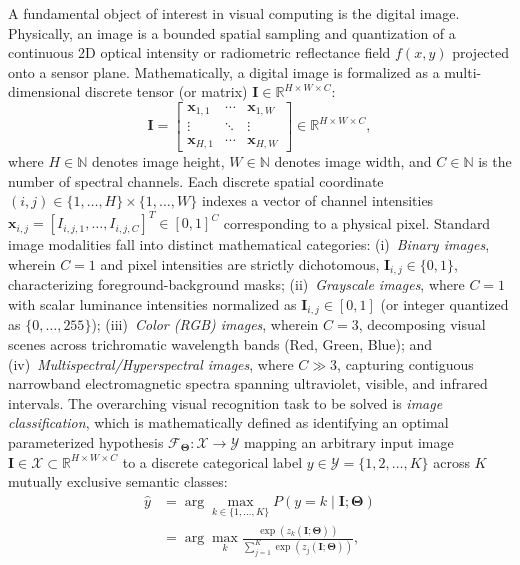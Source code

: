 \documentclass[journal]{IEEEtran}
\begin{document}
A fundamental object of interest in visual computing is the digital image. Physically, an image is a bounded spatial sampling and quantization of a continuous 2D optical intensity or radiometric reflectance field $f(x, y)$ projected onto a sensor plane. Mathematically, a digital image is formalized as a multi-dimensional discrete tensor (or matrix) $\mathbf{I} \in \mathbb{R}^{H \times W \times C}$:
\begin{equation}
\mathbf{I} = \begin{bmatrix}
\mathbf{x}_{1,1} & \cdots & \mathbf{x}_{1,W} \\
\vdots & \ddots & \vdots \\
\mathbf{x}_{H,1} & \cdots & \mathbf{x}_{H,W}
\end{bmatrix} \in \mathbb{R}^{H \times W \times C},
\label{eq:image_tensor_matrix}
\end{equation}
where $H \in \mathbb{N}$ denotes image height, $W \in \mathbb{N}$ denotes image width, and $C \in \mathbb{N}$ is the number of spectral channels. Each discrete spatial coordinate $(i, j) \in \{1, \dots, H\} \times \{1, \dots, W\}$ indexes a vector of channel intensities $\mathbf{x}_{i,j} = [I_{i,j,1}, \dots, I_{i,j,C}]^T \in [0, 1]^C$ corresponding to a physical pixel. Standard image modalities fall into distinct mathematical categories: (i)~\textit{Binary images}, wherein $C=1$ and pixel intensities are strictly dichotomous, $\mathbf{I}_{i,j} \in \{0, 1\}$, characterizing foreground-background masks; (ii)~\textit{Grayscale images}, where $C=1$ with scalar luminance intensities normalized as $\mathbf{I}_{i,j} \in [0, 1]$ (or integer quantized as $\{0, \dots, 255\}$); (iii)~\textit{Color (RGB) images}, wherein $C=3$, decomposing visual scenes across trichromatic wavelength bands (Red, Green, Blue); and (iv)~\textit{Multispectral/Hyperspectral images}, where $C \gg 3$, capturing contiguous narrowband electromagnetic spectra spanning ultraviolet, visible, and infrared intervals. The overarching visual recognition task to be solved is \textit{image classification}, which is mathematically defined as identifying an optimal parameterized hypothesis $\mathcal{F}_{\boldsymbol{\Theta}}: \mathcal{X} \to \mathcal{Y}$ mapping an arbitrary input image $\mathbf{I} \in \mathcal{X} \subset \mathbb{R}^{H \times W \times C}$ to a discrete categorical label $y \in \mathcal{Y} = \{1, 2, \dots, K\}$ across $K$ mutually exclusive semantic classes:
\begin{align}
\hat{y} &= \arg\max_{k \in \{1, \dots, K\}} P(y = k \mid \mathbf{I}; \boldsymbol{\Theta}) \nonumber \\
&= \arg\max_{k} \frac{\exp(z_k(\mathbf{I}; \boldsymbol{\Theta}))}{\sum_{j=1}^K \exp(z_j(\mathbf{I}; \boldsymbol{\Theta}))},
\label{eq:classification_mapping}
\end{align}
\end{document}
